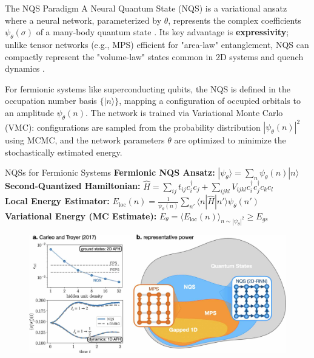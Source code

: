 \documentclass[final]{beamer}
\newlength{\colwidth}
\begin{document}
\begin{frame}[t]
\begin{columns}[t]
\begin{column}{\colwidth}
\begin{block}{The NQS Paradigm}
    A Neural Quantum State (NQS) is a variational ansatz where a neural network, parameterized by $\theta$, represents the complex coefficients $\psi_{\theta}(\sigma)$ of a many-body quantum state \cite{Carleo2017Science}. Its key advantage is \textbf{expressivity}; unlike tensor networks (e.g., MPS) efficient for "area-law" entanglement, NQS can compactly represent the "volume-law" states common in 2D systems and quench dynamics \cite{Lange2024Review, Sharir2022}.

    For fermionic systems like superconducting qubits, the NQS is defined in the occupation number basis $\{|n\rangle\}$, mapping a configuration of occupied orbitals to an amplitude $\psi_{\theta}(n)$. The network is trained via Variational Monte Carlo (VMC): configurations are sampled from the probability distribution $|\psi_{\theta}(n)|^2$ using MCMC, and the network parameters $\theta$ are optimized to minimize the stochastically estimated energy.
    \vspace{24px}
    \begin{exampleblock}{NQSs for Fermionic Systems}
    \textbf{Fermionic NQS Ansatz:} $|\psi_{\theta}\rangle = \sum_{n} \psi_{\theta}(n) |n\rangle$\\[12px]
    \textbf{Second-Quantized Hamiltonian:} $\hat{H} = \sum_{ij} t_{ij} c_i^\dagger c_j + \sum_{ijkl} V_{ijkl} c_i^\dagger c_j^\dagger c_k c_l$\\[12px]
    \textbf{Local Energy Estimator:} $E_{\text{loc}}(n) = \frac{1}{\psi_{\theta}(n)}\sum_{n'} \langle n|\hat{H}|n'\rangle \psi_{\theta}(n')$\\[12px]
    \textbf{Variational Energy (MC Estimate):} $E_{\theta} = \langle E_{\text{loc}}(n) \rangle_{n \sim |\psi_{\theta}|^2} \ge E_{gs}$\\[12px]
    \begin{figure}
      \centering
      \vspace{24px}
      \includegraphics[width=0.3\paperwidth]{img/nqsArch1.jpg}

\end{figure}
\end{exampleblock}
\end{block}
\end{column}
\end{columns}
\end{frame}
\end{document}
